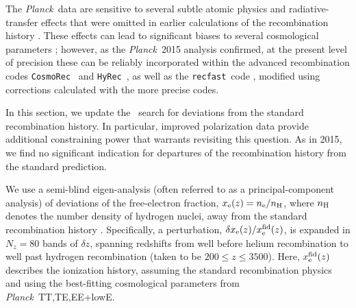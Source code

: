 \documentclass[longauth,traditabstract]{aa}
\def\Planck{\textit{Planck}}
\newcommand{\mksym}[1]{\ifmmode {\rm #1}\else #1\fi}
\newcommand{\dataplus}{\allowbreak+}
\newcommand{\TTTEEE}{\mksym{TT,TE,EE}}
\newcommand{\planckTTTEEEonly}{\planck\ \TTTEEE}
\newcommand{\lowE}{\mksym{lowE}}
\newcommand{\planckall}{\planckTTTEEEonly\dataplus\lowE}
\providecommand{\COSMOREC}{{\tt CosmoRec}}
\providecommand{\HYREC}{{\tt HyRec}}
\providecommand{\RECFAST}{{\tt recfast}}
\newcommand{\paramsII}{\citetalias{planck2014-a15}}
\newcommand{\planck}{\Planck}
\begin{document}
The \Planck\ data are sensitive to several subtle atomic physics and
radiative-transfer effects \citep[see e.g.,][]{Chluba2006, Kholupenko2007,
Switzer2007I} that were omitted in earlier calculations of the
recombination history \citep{Zeldovich68, Peebles68,
Seager2000}. These effects can lead to significant biases to several
cosmological parameters \citep[e.g.,][]{Jose2010, Shaw2011}; however,
as the \Planck\ 2015 analysis confirmed, at the present level of
precision these can be reliably incorporated within the advanced
recombination codes \COSMOREC\ \citep{Chluba2010b}
and \HYREC\ \citep{Yacine2010}, as well as the \RECFAST\
code \citep{Seager:1999bc, Wong2008}, modified using corrections
calculated with the more precise codes.

In this section, we update the \paramsII\ search for deviations from
the standard recombination history. In particular, improved
polarization data provide additional constraining power that warrants
revisiting this question. As in 2015, we find no significant
indication for departures of the recombination history from the
standard prediction.

We use a semi-blind eigen-analysis (often referred to as a
principal-component analysis) of deviations of the free-electron
fraction, $x_{\rm e}(z)=n_{\rm e}/n_{\rm H}$, where $n_{\rm H}$
denotes the number density of hydrogen nuclei, away from the standard
recombination history \citep{Farhang2011, Farhang2013}. Specifically,
a perturbation, $\delta x_{\rm e}(z)/x_{\rm e}^{\rm fid}(z)$, is
expanded in $N_z=80$ bands of $\delta z$, spanning redshifts from well
before helium recombination to well past hydrogen recombination (taken
to be $200\le z \le 3500$).  Here, $x_{\rm e}^{\rm fid}(z)$ describes
the ionization history, assuming the standard recombination physics
and using the best-fitting cosmological parameters from \planckall.
\end{document}
